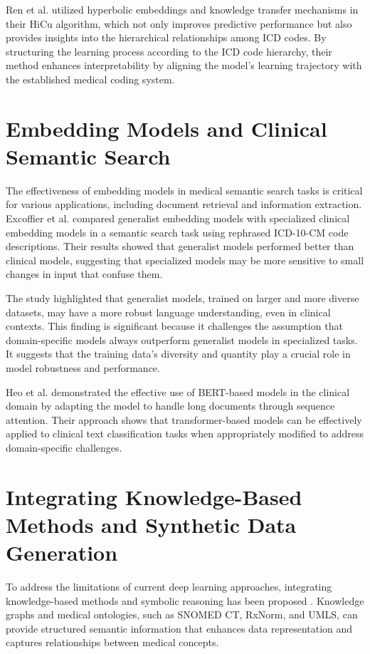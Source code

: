 \documentclass[12pt,a4paper]{report}
\begin{document}
Ren et al. \cite{ren2022hicu} utilized hyperbolic embeddings and knowledge transfer mechanisms in their HiCu algorithm, which not only improves predictive performance but also provides insights into the hierarchical relationships among ICD codes. By structuring the learning process according to the ICD code hierarchy, their method enhances interpretability by aligning the model's learning trajectory with the established medical coding system.

\section{Embedding Models and Clinical Semantic Search}

The effectiveness of embedding models in medical semantic search tasks is critical for various applications, including document retrieval and information extraction. Excoffier et al. \cite{excoffier2024generalist} compared generalist embedding models with specialized clinical embedding models in a semantic search task using rephrased ICD-10-CM code descriptions. Their results showed that generalist models performed better than clinical models, suggesting that specialized models may be more sensitive to small changes in input that confuse them.

The study highlighted that generalist models, trained on larger and more diverse datasets, may have a more robust language understanding, even in clinical contexts. This finding is significant because it challenges the assumption that domain-specific models always outperform generalist models in specialized tasks. It suggests that the training data's diversity and quantity play a crucial role in model robustness and performance.

Heo et al. \cite{heo2022medical} demonstrated the effective use of BERT-based models in the clinical domain by adapting the model to handle long documents through sequence attention. Their approach shows that transformer-based models can be effectively applied to clinical text classification tasks when appropriately modified to address domain-specific challenges.

\section{Integrating Knowledge-Based Methods and Synthetic Data Generation}

To address the limitations of current deep learning approaches, integrating knowledge-based methods and symbolic reasoning has been proposed \cite{dong2022automated}. Knowledge graphs and medical ontologies, such as SNOMED CT, RxNorm, and UMLS, can provide structured semantic information that enhances data representation and captures relationships between medical concepts.
\end{document}
